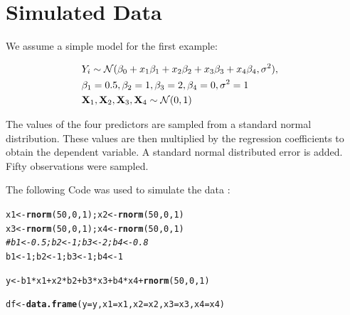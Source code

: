 \documentclass[11pt,a4paper,twoside]{book}\usepackage[]{graphicx}\usepackage[]{color}
\makeatletter
\newcommand{\hlnum}[1]{\textcolor[rgb]{0.686,0.059,0.569}{#1}}%
\newcommand{\hlcom}[1]{\textcolor[rgb]{0.678,0.584,0.686}{\textit{#1}}}%
\newcommand{\hlopt}[1]{\textcolor[rgb]{0,0,0}{#1}}%
\newcommand{\hlstd}[1]{\textcolor[rgb]{0.345,0.345,0.345}{#1}}%
\newcommand{\hlkwb}[1]{\textcolor[rgb]{0.69,0.353,0.396}{#1}}%
\newcommand{\hlkwc}[1]{\textcolor[rgb]{0.333,0.667,0.333}{#1}}%
\newcommand{\hlkwd}[1]{\textcolor[rgb]{0.737,0.353,0.396}{\textbf{#1}}}%
\newenvironment{kframe}{%
 \def\at@end@of@kframe{}%
 \ifinner\ifhmode%
  \def\at@end@of@kframe{\end{minipage}}%
  \begin{minipage}{\columnwidth}%
 \fi\fi%
 \def\FrameCommand##1{\hskip\@totalleftmargin \hskip-\fboxsep
 \colorbox{shadecolor}{##1}\hskip-\fboxsep
     \hskip-\linewidth \hskip-\@totalleftmargin \hskip\columnwidth}%
 \MakeFramed {\advance\hsize-\width
   \@totalleftmargin\z@ \linewidth\hsize
   \@setminipage}}%
 {\par\unskip\endMakeFramed%
 \at@end@of@kframe}
\newenvironment{knitrout}{}{} %
\makeatother
\begin{document}
\section{Simulated Data}

We assume a simple model for the first example: 

\begin{align*} 
&Y_{i} \sim \mathcal{N}(\beta_{0}+x_{1} \beta_{1}+x_{2} \beta_{2}+x_{3} \beta_{3}+x_{4} \beta_{4}, \sigma^2),& \\ & \beta_{1} = 0.5, \beta_{2} = 1,  \beta_{3} = 2 , \beta_{4}=0, \sigma^2 = 1 & \\ & {\mathbf{X}}_{1}, {\mathbf{X}}_{2},{\mathbf{X}}_{3},{\mathbf{X}}_{4} \sim \mathcal{N}(0, 1) 
\end{align*} 


The values of the four predictors are sampled from a standard normal distribution. These values are then multiplied by the regression coefficients to obtain the dependent variable. A standard normal distributed error is added. Fifty observations were sampled.

The following Code was used to simulate the data :

\begin{knitrout}
\color{fgcolor}\begin{kframe}
\begin{alltt}
\hlstd{x1} \hlkwb{<-} \hlkwd{rnorm}\hlstd{(}\hlnum{50}\hlstd{,} \hlnum{0}\hlstd{,} \hlnum{1}\hlstd{); x2} \hlkwb{<-} \hlkwd{rnorm}\hlstd{(}\hlnum{50}\hlstd{,} \hlnum{0}\hlstd{,} \hlnum{1}\hlstd{)}
\hlstd{x3} \hlkwb{<-} \hlkwd{rnorm}\hlstd{(}\hlnum{50}\hlstd{,} \hlnum{0}\hlstd{,} \hlnum{1}\hlstd{); x4} \hlkwb{<-} \hlkwd{rnorm}\hlstd{(}\hlnum{50}\hlstd{,} \hlnum{0}\hlstd{,} \hlnum{1}\hlstd{)}
\hlcom{#b1 <- 0.5; b2 <- 1; b3 <- 2; b4 <- 0.8}
\hlstd{b1} \hlkwb{<-} \hlnum{1}\hlstd{; b2} \hlkwb{<-} \hlnum{1}\hlstd{; b3} \hlkwb{<-} \hlnum{1}\hlstd{; b4} \hlkwb{<-} \hlnum{1}

\hlstd{y} \hlkwb{<-} \hlstd{b1}\hlopt{*}\hlstd{x1} \hlopt{+} \hlstd{x2}\hlopt{*}\hlstd{b2} \hlopt{+} \hlstd{b3}\hlopt{*}\hlstd{x3} \hlopt{+} \hlstd{b4}\hlopt{*}\hlstd{x4} \hlopt{+} \hlkwd{rnorm}\hlstd{(}\hlnum{50}\hlstd{,} \hlnum{0}\hlstd{,} \hlnum{1}\hlstd{)}


\hlstd{df} \hlkwb{<-} \hlkwd{data.frame}\hlstd{(}\hlkwc{y} \hlstd{= y,} \hlkwc{x1} \hlstd{= x1,} \hlkwc{x2} \hlstd{= x2,} \hlkwc{x3} \hlstd{= x3,} \hlkwc{x4} \hlstd{= x4)}
\end{alltt}
\end{kframe}
\end{knitrout}
\end{document}
